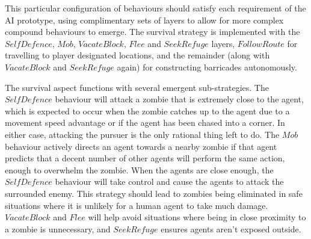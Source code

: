 \documentclass[12pt,a4paper]{article}
\begin{document}
\noindent
\begin{itemize}
\end{itemize}

This particular configuration of behaviours should satisfy each requirement of the AI prototype, using complimentary sets of layers to allow for more complex compound behaviours to emerge. The survival strategy is implemented with the $SelfDefence$, $Mob$, $VacateBlock$, $Flee$ and $SeekRefuge$ layers, $FollowRoute$ for travelling to player designated locations, and the remainder (along with $VacateBlock$ and $SeekRefuge$ again) for constructing barricades autonomously.

The survival aspect functions with several emergent sub-strategies. The $SelfDefence$ behaviour will attack a zombie that is extremely close to the agent, which is expected to occur when the zombie catches up to the agent due to a movement speed advantage or if the agent has been chased into a corner. In either case, attacking the pursuer is the only rational thing left to do. The $Mob$ behaviour actively directs an agent towards a nearby zombie if that agent predicts that a decent number of other agents will perform the same action, enough to overwhelm the zombie. When the agents are close enough, the $SelfDefence$ behaviour will take control and cause the agents to attack the surrounded enemy. This strategy should lead to zombies being eliminated in safe situations where it is unlikely for a human agent to take much damage. $VacateBlock$ and $Flee$ will help avoid situations where being in close proximity to a zombie is unnecessary, and $SeekRefuge$ ensures agents aren't exposed outside.
\end{document}
